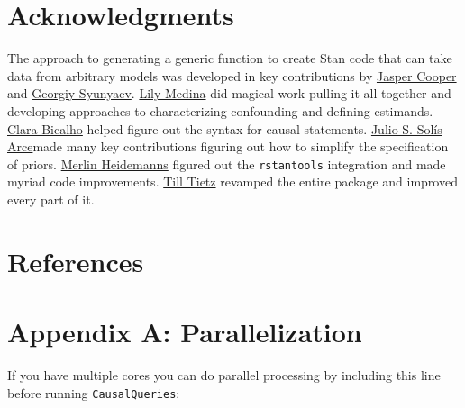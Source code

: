 \documentclass[
  11pt,
  article]{jss}
\begin{document}
\hypertarget{acknowledgments}{%
\section*{Acknowledgments}\label{acknowledgments}}

\begin{tcolorbox}[enhanced jigsaw, colback=white, bottomrule=.15mm, toprule=.15mm, leftrule=.75mm, left=2mm, breakable, arc=.35mm, rightrule=.15mm, opacityback=0]

The approach to generating a generic function to create Stan code that
can take data from arbitrary models was developed in key contributions
by \href{http://jasper-cooper.com/}{Jasper Cooper} and
\href{http://gsyunyaev.com/}{Georgiy Syunyaev}.
\href{https://lilymedina.github.io/}{Lily Medina} did magical work
pulling it all together and developing approaches to characterizing
confounding and defining estimands.
\href{https://clarabicalho.github.io/}{Clara Bicalho} helped figure out
the syntax for causal statements.
\href{https://www.gov.harvard.edu/directory/julio-s-solis-arce/}{Julio
S. Solís Arce}made many key contributions figuring out how to simplify
the specification of priors.
\href{https://merlinheidemanns.github.io/website/}{Merlin Heidemanns}
figured out the \texttt{rstantools} integration and made myriad code
improvements. \href{https://github.com/till-tietz}{Till Tietz} revamped
the entire package and improved every part of it.

\end{tcolorbox}

\hypertarget{references}{%
\section*{References}\label{references}}

\renewcommand{\bibsection}{}


\newpage{}

\hypertarget{sec-parallel}{%
\section*{Appendix A: Parallelization}\label{sec-parallel}}

If you have multiple cores you can do parallel processing by including
this line before running \texttt{CausalQueries}:
\end{document}

